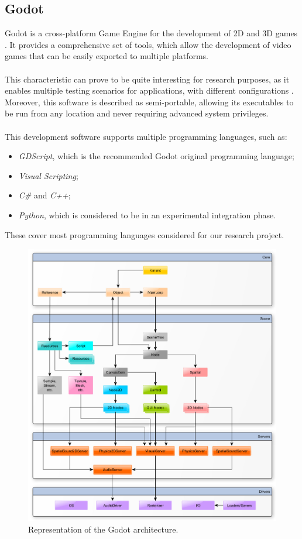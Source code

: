 \subsection{Godot}
Godot is a cross-platform Game Engine for the development of 2D and 3D games \cite{site:godot-doc}. It provides a comprehensive set of tools, which allow the development of video games that can be easily exported to multiple platforms. \\ \\
This characteristic can prove to be quite interesting for research purposes, as it enables multiple testing scenarios for applications, with different configurations \cite{site:godot-github}. Moreover, this software is described as semi-portable, allowing its executables to be run from any location and never requiring advanced system privileges. \\ \\
This development software supports multiple programming languages, such as:
\begin{itemize}
	\item \textit{GDScript}, which is the recommended Godot original programming language;
	\item \textit{Visual Scripting};
	\item \textit{C\#} and \textit{C++};
	\item \textit{Python}, which is considered to be in an experimental integration phase.
\end{itemize}
These cover most programming languages considered for our research project.
\begin{figure}[h!]
	\centering
	\includegraphics[width=0.9\linewidth]{"immagini/Feasibility study/architecture_diagram"}
	\caption[Representation of the Godot architecture.]{Representation of the Godot architecture.}
	\label{fig:architecture-diagram}
\end{figure}

